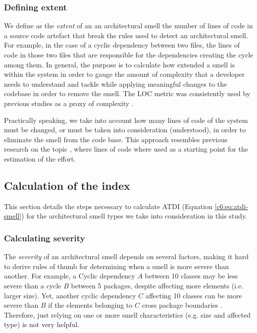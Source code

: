 \subsubsection{Defining extent}\label{c6:sec:approach-extent}
We define as the \emph{extent} of an an architectural smell the number of lines of code in a source code artefact that break the rules used to detect an architectural smell.
For example, in the case of a cyclic dependency between two files, the lines of code in those two files that are responsible for the dependencies creating the cycle among them.
In general, the purpose is to calculate how extended a smell is within the system in order to gauge the amount of complexity that a developer needs to understand and tackle while applying meaningful changes to the codebase in order to remove the smell.
The LOC metric was consistently used by previous studies as a proxy of complexity \cite{Morasca2001, Kitchenham2004, Morozoff2010}.%

Practically speaking, we take into account how many lines of code of the system must be changed, or must be taken into consideration (understood), in order to eliminate the smell from the code base.
This approach resembles previous research on the topic \cite{Nugroho2011}, where lines of code where used as a starting point for the estimation of the effort.

\subsection{Calculation of the index}\label{label:index-calculation}
This section details the steps necessary to calculate ATDI (Equation \ref{c6:eq:atdi-smell}) for the architectural smell types we take into consideration in this study.

\subsubsection{Calculating severity}\label{c6:sec:calculating-severity}
The \emph{severity} of an architectural smell depends on several factors, making it hard to derive rules of thumb for determining when a smell is more severe than another.
For example, a Cyclic dependency $A$ between 10 classes may be less severe than a cycle $B$ between 5 packages, despite affecting more elements (i.e. larger size). Yet, another cyclic dependency $C$ affecting 10 classes can be more severe than $B$ if the elements belonging to $C$ cross package boundaries \cite{Laval2012}.
Therefore, just relying on one or more smell characteristics (e.g. size and affected type) is not very helpful.

